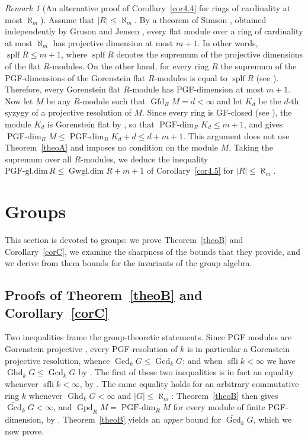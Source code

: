 \documentclass[12pt]{amsart}
\theoremstyle{remark}
\newtheorem{remark}[theorem]{Remark}
\theoremstyle{definition}
\theoremstyle{plain}
\DeclareMathOperator{\Ghd}{Ghd}
\DeclareMathOperator{\Gcd}{Gcd}
\DeclareMathOperator{\Gfd}{Gfd}
\DeclareMathOperator{\Gpd}{Gpd}
\DeclareMathOperator{\sfli}{sfli}
\DeclareMathOperator{\Gwgl}{Gwgl.dim}
\newcommand{\PGFdim}{\operatorname{PGF\text{-}dim}}
\newcommand{\PGFcd}{\widetilde{\Gcd}}
\newcommand{\alephm}{\aleph_m}
\begin{document}
\begin{remark}[An alternative proof of Corollary~\ref{cor4.4} for rings of cardinality at most $\alephm$]\label{rem4.6}
Assume that $|R|\le\alephm$. By a theorem of Simson \cite[Theorem]{Simson}, obtained independently by Gruson and Jensen \cite{GJ}, every flat module over a ring of cardinality at most $\alephm$ has projective dimension at most $m+1$. In other words, $\operatorname{splf}R\le m+1$, where $\operatorname{splf}R$ denotes the supremum of the projective dimensions of the flat $R$-modules. On the other hand, for every ring $R$ the supremum of the PGF-dimensions of the Gorenstein flat $R$-modules is equal to $\operatorname{splf}R$ (see \cite[Proposition~15]{DE}). Therefore, every Gorenstein flat $R$-module has PGF-dimension at most $m+1$. Now let $M$ be any $R$-module such that $\Gfd_RM=d<\infty$ and let $K_d$ be the $d$-th syzygy of a projective resolution of $M$. Since every ring is GF-closed (see \cite[Corollary~4.12]{SS}), the module $K_d$ is Gorenstein flat by \cite[Theorem~2.8]{Ben}, so that $\PGFdim_RK_d\le m+1$, and \cite[Lemma~1.2]{St0} gives $\PGFdim_RM\le\PGFdim_RK_d+d\le d+m+1$. This argument does not use Theorem~\ref{theoA} and imposes no condition on the module $M$. Taking the supremum over all $R$-modules, we deduce the inequality $\mathrm{PGF\text{-}gl.dim}\,R\le\Gwgl R+m+1$ of Corollary~\ref{cor4.5} for $|R|\le\alephm$.
\end{remark}

\section{Groups}\label{sec:groups}

This section is devoted to groups: we prove Theorem~\ref{theoB} and Corollary~\ref{corC}, we examine the sharpness of the bounds that they provide, and we derive from them bounds for the invariants of the group algebra.

\subsection{Proofs of Theorem~\texorpdfstring{\ref{theoB}}{B} and Corollary~\texorpdfstring{\ref{corC}}{C}}

Two inequalities frame the group-theoretic statements. Since PGF modules are Gorenstein projective \cite{SS}, every PGF-resolution of $k$ is in particular a Gorenstein projective resolution, whence $\Gcd_kG\le\PGFcd_kG$; and when $\sfli k<\infty$ we have $\Ghd_kG\le\Gcd_kG$ by \cite[Theorem~3.10]{KS}. The first of these two inequalities is in fact an equality whenever $\sfli k<\infty$, by \cite[Proposition 2.13]{St0}. The same equality holds for an arbitrary commutative ring $k$ whenever $\Ghd_kG<\infty$ and $|G|\le\alephm$: Theorem~\ref{theoB} then gives $\PGFcd_kG<\infty$, and $\Gpd_RM=\PGFdim_RM$ for every module of finite PGF-dimension, by \cite[Corollary~13(ii)]{DE}. Theorem~\ref{theoB} yields an \emph{upper} bound for $\PGFcd_kG$, which we now prove.
\end{document}
